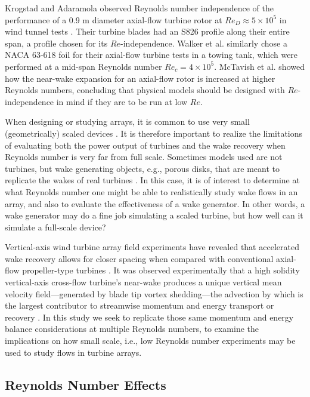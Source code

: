 \documentclass[energies,article,accept,moreauthors,pdftex,12pt,a4paper]{mdpi}
\begin{document}
Krogstad and Adaramola observed Reynolds number independence of the performance
of a 0.9 m diameter axial-flow turbine rotor at $Re_D \approx 5 \times 10^5$ in
wind tunnel tests \cite{Krogstad2012a}. Their turbine blades had an S826 profile
along their entire span, a profile chosen for its $Re$-independence. Walker et
al. \cite{Walker2014} similarly chose a NACA 63-618 foil for their axial-flow
turbine tests in a towing tank, which were performed at a mid-span Reynolds
number $Re_c = 4 \times 10^5$. McTavish et al. \cite{McTavish2013} showed how
the near-wake expansion for an axial-flow rotor is increased at higher Reynolds
numbers, concluding that physical models should be designed with
$Re$-independence in mind if they are to be run at low $Re$.

When designing or studying arrays, it is common to use very small
(geometrically) scaled devices \cite{Chamorro2011, Chamorro2011b}. It is
therefore important to realize the limitations of evaluating both the power
output of turbines and the wake recovery when Reynolds number is very far from
full scale. Sometimes models used are not turbines, but wake generating objects,
e.g., porous disks, that are meant to replicate the wakes of real turbines
\cite{Goldenberg1983}. In this case, it is of interest to determine at what
Reynolds number one might be able to realistically study wake flows in an array,
and also to evaluate the effectiveness of a wake generator. In other words, a
wake generator may do a fine job simulating a scaled turbine, but how well can
it simulate a full-scale device?

Vertical-axis wind turbine array field experiments have revealed that
accelerated wake recovery allows for closer spacing when compared with
conventional axial-flow propeller-type turbines \cite{Dabiri2011, Kinzel2012}.
It was observed experimentally that a high solidity vertical-axis cross-flow
turbine's near-wake produces a unique vertical mean velocity field---generated
by blade tip vortex shedding---the advection by which is the largest contributor
to streamwise momentum and energy transport or recovery \cite{Bachant2015-JoT}.
In this study we seek to replicate those same momentum and energy balance
considerations at multiple Reynolds numbers, to examine the implications on how
small scale, i.e., low Reynolds number experiments may be used to study flows in
turbine arrays.


\subsection{Reynolds Number Effects}
\end{document}
